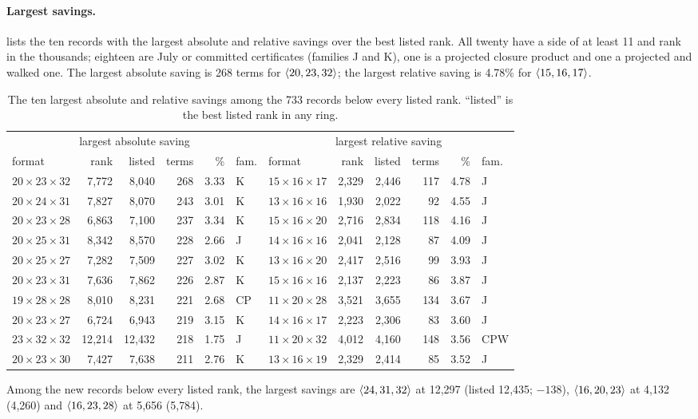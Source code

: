 \paragraph{Largest savings.}
 lists the ten records with the largest absolute and relative savings over the best listed rank. All twenty have a side of at least 11 and rank in the thousands; eighteen are July or committed certificates (families J and K), one is a projected closure product and one a projected and walked one. The largest absolute saving is 268 terms for $\langle 20,23,32\rangle$; the largest relative saving is 4.78\% for $\langle 15,16,17\rangle$.
\begin{table}[t]
\centering\footnotesize
\begin{tabular}{@{}lrrrrl@{\hspace{7mm}}lrrrrl@{}}
\toprule
\multicolumn{6}{c}{largest absolute saving} & \multicolumn{6}{c}{largest relative saving}\\
format & rank & listed & terms & \% & fam. & format & rank & listed & terms & \% & fam.\\
\midrule
$20{\times}23{\times}32$ & 7{,}772 & 8{,}040 & 268 & 3.33 & K & $15{\times}16{\times}17$ & 2{,}329 & 2{,}446 & 117 & 4.78 & J\\
$20{\times}24{\times}31$ & 7{,}827 & 8{,}070 & 243 & 3.01 & K & $13{\times}16{\times}16$ & 1{,}930 & 2{,}022 & 92 & 4.55 & J\\
$20{\times}23{\times}28$ & 6{,}863 & 7{,}100 & 237 & 3.34 & K & $15{\times}16{\times}20$ & 2{,}716 & 2{,}834 & 118 & 4.16 & J\\
$20{\times}25{\times}31$ & 8{,}342 & 8{,}570 & 228 & 2.66 & J & $14{\times}16{\times}16$ & 2{,}041 & 2{,}128 & 87 & 4.09 & J\\
$20{\times}25{\times}27$ & 7{,}282 & 7{,}509 & 227 & 3.02 & K & $13{\times}16{\times}20$ & 2{,}417 & 2{,}516 & 99 & 3.93 & J\\
$20{\times}23{\times}31$ & 7{,}636 & 7{,}862 & 226 & 2.87 & K & $15{\times}16{\times}16$ & 2{,}137 & 2{,}223 & 86 & 3.87 & J\\
$19{\times}28{\times}28$ & 8{,}010 & 8{,}231 & 221 & 2.68 & CP & $11{\times}20{\times}28$ & 3{,}521 & 3{,}655 & 134 & 3.67 & J\\
$20{\times}23{\times}27$ & 6{,}724 & 6{,}943 & 219 & 3.15 & K & $14{\times}16{\times}17$ & 2{,}223 & 2{,}306 & 83 & 3.60 & J\\
$23{\times}32{\times}32$ & 12{,}214 & 12{,}432 & 218 & 1.75 & J & $11{\times}20{\times}32$ & 4{,}012 & 4{,}160 & 148 & 3.56 & CPW\\
$20{\times}23{\times}30$ & 7{,}427 & 7{,}638 & 211 & 2.76 & K & $13{\times}16{\times}19$ & 2{,}329 & 2{,}414 & 85 & 3.52 & J\\
\bottomrule
\end{tabular}
\caption{The ten largest absolute and relative savings among the 733 records below every listed rank. ``listed'' is the best listed rank in any ring.}
\label{tab:top}
\end{table}
Among the new records below every listed rank, the largest savings are $\langle 24,31,32\rangle$ at 12{,}297 (listed 12{,}435; $-138$), $\langle 16,20,23\rangle$ at 4{,}132 (4{,}260) and $\langle 16,23,28\rangle$ at 5{,}656 (5{,}784).

